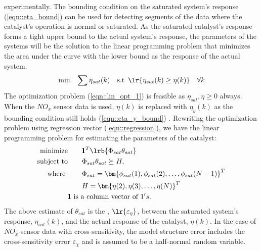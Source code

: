 experimentally. The bounding condition on the saturated system's response (\ref{eqn::eta_bound}) can be used for
detecting segments of the data where the catalyst's operation is normal or saturated. As the saturated catalyst's
response forms a tight upper bound to the actual system's response, the parameters of the systems will be the solution
to the linear programming problem that minimizes the area under the curve with the lower bound as the response of the
actual system.
\begin{align}
\text{min. } \, \sum \eta_{sat}(k) \quad
\text{s.t } \, \lr{\eta_{sat}(k) \geq \eta(k)} \quad \forall  k \label{eqn::lin_opt_1}
\end{align}
The optimization problem (\ref{eqn::lin_opt_1}) is feasible as $\eta_{sat}, \eta \geq 0$ always. When the $NO_x$ sensor
data is used, $\eta(k)$ is replaced with $\eta_y(k)$ as the bounding condition still holds (\ref{eqn::eta_y_bound}) .
Rewriting the optimization problem using regression vector (\ref{eqn::regression}), we have the linear programming
problem for estimating the parameters of the catalyst:
\begin{align}
        \text{minimize} &\qquad \pmb 1^T \lrb{\Phi_{sat} \theta_{sat}}      \label{eqn::lin_prog}\\
        \text{subject to} &\qquad \Phi_{sat} \theta_{sat} \succeq H,  \notag\\
        \text{where } & \qquad
        \Phi_{sat} = \bm{\phi_{sat}(1), \phi_{sat}(2), \hdots, \phi_{sat}(N-1)}^T \notag\\
        &\qquad H = \bm{ \eta(2), \eta(3), \hdots, \eta(N)}^T \notag\\
        & \text{$\pmb 1$ is a column vector of $1's$.} \notag
\end{align}
The above estimate of $\theta_{sat}$ is the , $\lr{\varepsilon_\eta}$, between the saturated system's response,
$\eta_{sat}(k)$, and the actual response of the catalyst, $\eta(k)$. In the
case of $NO_x$-sensor data with cross-sensitivity, the model structure error includes the cross-sensitivity error
$\varepsilon_{\chi}$ and is assumed to be a half-normal random variable.


